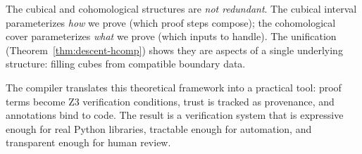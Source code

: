The cubical and cohomological structures are \emph{not redundant}.
The cubical interval parameterizes \emph{how} we prove (which proof
steps compose); the cohomological cover parameterizes \emph{what}
we prove (which inputs to handle).  The unification
(Theorem~\ref{thm:descent-hcomp}) shows they are aspects of a
single underlying structure: filling cubes from compatible
boundary data.

The compiler translates this theoretical framework into a practical
tool: proof terms become Z3 verification conditions, trust is
tracked as provenance, and annotations bind to code.  The result
is a verification system that is expressive enough for real Python
libraries, tractable enough for automation, and transparent enough
for human review.
